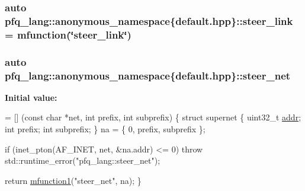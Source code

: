 \hypertarget{namespacepfq__lang_1_1anonymous__namespace_02default_8hpp_03_af339132b49ec24313a1b3d33cefb1628}{
\subsubsection[{steer\+\_\+link}]{\setlength{\rightskip}{0pt plus 5cm}auto pfq\+\_\+lang\+::anonymous\+\_\+namespace\{default.\+hpp\}\+::steer\+\_\+link = {\bf mfunction}(\char`\"{}steer\+\_\+link\char`\"{})}}\label{namespacepfq__lang_1_1anonymous__namespace_02default_8hpp_03_af339132b49ec24313a1b3d33cefb1628}
\hypertarget{namespacepfq__lang_1_1anonymous__namespace_02default_8hpp_03_a2c53e95204f3841919f780940b607d68}{
\subsubsection[{steer\+\_\+net}]{\setlength{\rightskip}{0pt plus 5cm}auto pfq\+\_\+lang\+::anonymous\+\_\+namespace\{default.\+hpp\}\+::steer\+\_\+net}}\label{namespacepfq__lang_1_1anonymous__namespace_02default_8hpp_03_a2c53e95204f3841919f780940b607d68}
{\bfseries Initial value\+:}
\begin{DoxyCode}
= [] (\textcolor{keyword}{const} \textcolor{keywordtype}{char} *net, \textcolor{keywordtype}{int} prefix, \textcolor{keywordtype}{int} subprefix)
        \{
            \textcolor{keyword}{struct }supernet \{
                uint32\_t \hyperlink{namespacepfq__lang_1_1anonymous__namespace_02default_8hpp_03_aafce8334d1be83bff9a2115439c8c453}{addr};
                \textcolor{keywordtype}{int}      prefix;
                \textcolor{keywordtype}{int}      subprefix;
            \} na = \{ 0, prefix, subprefix \};

            \textcolor{keywordflow}{if} (inet\_pton(AF\_INET, net, &na.addr) <= 0)
                \textcolor{keywordflow}{throw} std::runtime\_error(\textcolor{stringliteral}{"pfq\_lang::steer\_net"});

            \textcolor{keywordflow}{return} \hyperlink{namespacepfq__lang_a3cc9d61411c0398bb46aa2b33a21f7ed}{mfunction1}(\textcolor{stringliteral}{"steer\_net"}, na);
        \}
\end{DoxyCode}

